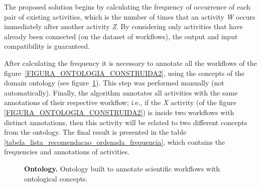 \documentclass[10pt,letterpaper]{article}
\begin{document}
The proposed solution begins by calculating the frequency of occurrence of each pair of existing activities, which is the number of times that an activity \emph{W} occurs immediately after another activity \emph{Z}. By considering only activities that have already been connected (on the dataset of workflows), the output and input compatibility is guaranteed.

After calculating the frequency it is necessary to annotate all the workflows of the figure~\ref{FIGURA_ONTOLOGIA_CONSTRUIDA2}, using the concepts of the domain ontology (see figure~\ref{FIGURA_ONTOLOGIA_CONSTRUIDA}). This step was performed manually (not automatically). Finally, the algorithm annotates all activities with the same annotations of their respective workflow; i.e., if the \emph{X} activity (of the figure \ref{FIGURA_ONTOLOGIA_CONSTRUIDA2}) is inside two workflows with distinct annotations, then this activity will be related to two different concepts from the ontology. The final result is presented in the table \ref{tabela_lista_recomendacao_ordenada_frequencia}, which contains the frequencies and annotations of activities.

\begin{figure}[!h]
	\caption{{\bf Ontology.} Ontology built to annotate scientific workflows with ontological concepts.}
	\label{FIGURA_ONTOLOGIA_CONSTRUIDA}
\end{figure}
\end{document}
